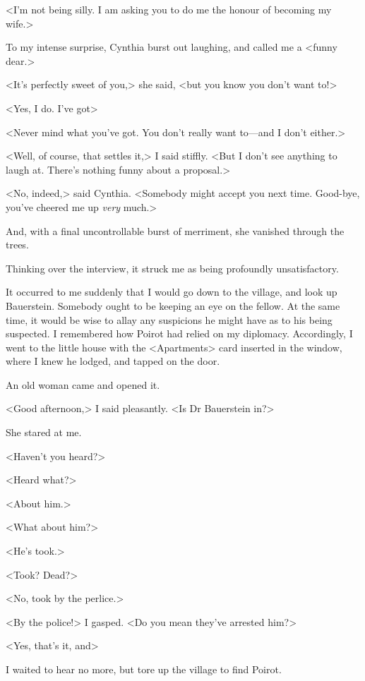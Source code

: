  <I'm not being silly. I am asking you to do me the honour of becoming my wife.> 

 To my intense surprise, Cynthia burst out laughing, and called me a <funny dear.> 

 <It's perfectly sweet of you,> she said, <but you know you don't want to!> 

 <Yes, I do. I've got\longdash> 

 <Never mind what you've got. You don't really want to—and I don't either.> 

 <Well, of course, that settles it,> I said stiffly. <But I don't see anything to laugh at. There's nothing funny about a proposal.> 

 <No, indeed,> said Cynthia. <Somebody might accept you next time. Good-bye, you've cheered me up \emph{very} much.> 

 And, with a final uncontrollable burst of merriment, she vanished through the trees. 

 Thinking over the interview, it struck me as being profoundly unsatisfactory. 

 It occurred to me suddenly that I would go down to the village, and look up Bauerstein. Somebody ought to be keeping an eye on the fellow. At the same time, it would be wise to allay any suspicions he might have as to his being suspected. I remembered how Poirot had relied on my diplomacy. Accordingly, I went to the little house with the <Apartments> card inserted in the window, where I knew he lodged, and tapped on the door. 

 An old woman came and opened it. 

 <Good afternoon,> I said pleasantly. <Is Dr Bauerstein in?> 

 She stared at me. 

 <Haven't you heard?> 

 <Heard what?> 

 <About him.> 

 <What about him?> 

 <He's took.> 

 <Took? Dead?> 

 <No, took by the perlice.> 

 <By the police!> I gasped. <Do you mean they've arrested him?> 

 <Yes, that's it, and\longdash> 

 I waited to hear no more, but tore up the village to find Poirot. 